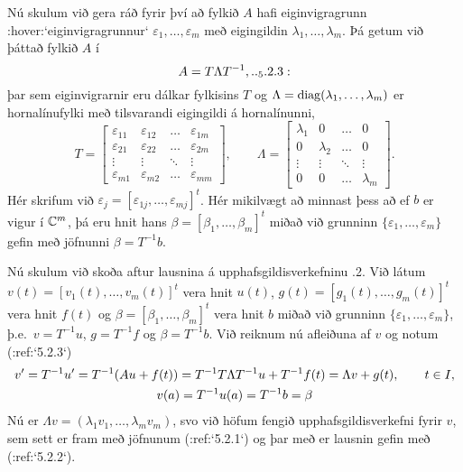 Nú skulum við  gera ráð fyrir því að
fylkið $A$ hafi eiginvigragrunn :hover:`eiginvigragrunnur`
$\varepsilon_1,\dots, \varepsilon_m$ með
eigingildin $\lambda_1,\dots,\lambda_m$.  Þá getum við þáttað fylkið
$A$ í
 \begin{equation*}A=T\Lambda T\sp{-1},

.. _5.2.3:

 \end{equation*}
þar sem eiginvigrarnir eru dálkar fylkisins $T$  og
$\Lambda={\operatorname{diag}}(\lambda_1,\dots,\lambda_m)  $ er
hornalínufylki með tilsvarandi  eigingildi á hornalínunni,
 $$T=\left[\begin{matrix}
\varepsilon_{11}&\varepsilon_{12}&\dots&\varepsilon_{1m}\\
\varepsilon_{21}&\varepsilon_{22}&\dots&\varepsilon_{2m}\\
\vdots&\vdots&\ddots&\vdots\\
\varepsilon_{m1}&\varepsilon_{m2}&\dots&\varepsilon_{mm}
\end{matrix}\right],\qquad
\Lambda =\left[\begin{matrix}
\lambda_1&0&\dots&0\\
0&\lambda_2&\dots&0\\
\vdots&\vdots&\ddots&\vdots\\
0&0&\dots&\lambda_m
\end{matrix}\right].
 $$
Hér skrifum við $\varepsilon_j=[\varepsilon_{1j},\dots,\varepsilon_{mj}]^t$.  
Hér mikilvægt að minnast þess að ef $b$ er vigur í ${\mathbb C}^m$, þá eru
hnit hans $\beta=[\beta_1,\dots,\beta_m]^t$ miðað við grunninn
$\{\varepsilon_1,\dots,\varepsilon_m\}$ gefin með  jöfnunni ${\beta}=T^{-1}b$.

Nú skulum við skoða aftur lausnina á upphafsgildisverkefninu .2.
Við látum $v(t)=[v_1(t),\dots,v_m(t)]^t$ vera hnit $u(t)$, 
$g(t)=[g_1(t),\dots,g_m(t)]^t$ vera hnit $f(t)$ og
$\beta=[\beta_1,\dots,\beta_m]^t$ 
vera hnit $b$ miðað við grunninn
$\{\varepsilon_1,\dots,\varepsilon_m\}$, þ.e.~$v=T^{-1}u$,
$g=T^{-1}f$ og $\beta=T^{-1}b$.
Við reiknum nú afleiðuna af $v$ og notum (:ref:`5.2.3`)
\begin{gather*}
v{\sp{\prime}}=T^{-1}u{\sp{\prime}}=T^{-1}(Au+f(t))=
T^{-1}T\Lambda T^{-1}u+T^{-1}f(t)=\Lambda v+g(t), \qquad t\in I,\\
v(a)=T^{-1}u(a)=T^{-1}b=\beta 
\end{gather*}
Nú er $\Lambda v=(\lambda_1v_1,\dots,\lambda_mv_m)$, svo við höfum fengið
upphafsgildisverkefni fyrir $v$, sem sett
er fram með jöfnunum (:ref:`5.2.1`) og þar með er lausnin gefin með 
(:ref:`5.2.2`).


